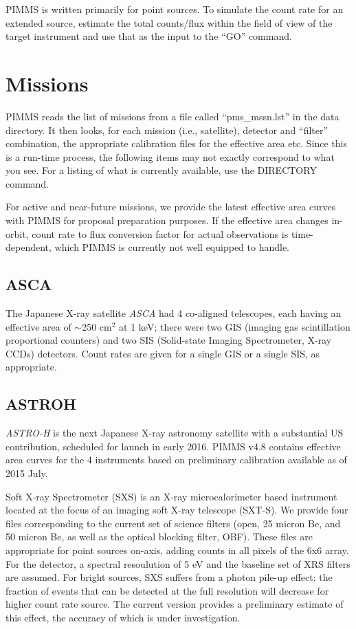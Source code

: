 PIMMS is written primarily for point sources.  To simulate the count
rate for an extended source, estimate the total counts/flux within the
field of view of the target instrument and use that as the input to
the ``GO'' command.

\section{Missions}

PIMMS reads the list of missions from a file called ``pms\_mssn.lst'' in the
data directory.     It then looks, for each mission (i.e., satellite),
detector and ``filter'' combination, the  appropriate calibration files for the
effective area etc.   Since this is a run-time process, the following items
may not exactly correspond to what you see.   For a listing of what is
currently available, use the DIRECTORY command.

For active and near-future missions, we provide the latest effective area
curves with PIMMS for proposal preparation purposes.  If the effective area
changes in-orbit, count rate to flux conversion factor for actual observations
is time-dependent, which PIMMS is currently not well equipped to handle.

\subsection{ASCA}

The Japanese X-ray satellite {\em ASCA\/} had 4 co-aligned telescopes,
each having an effective area  of $\sim$250 cm$^2$ at 1 keV; there were
two GIS (imaging gas scintillation proportional counters) and two SIS
(Solid-state Imaging Spectrometer, X-ray CCDs) detectors.  Count rates
are given for a single GIS or a single SIS, as appropriate.

\subsection{ASTROH}

{\em ASTRO-H\/} is the next Japanese X-ray astronomy satellite with a
substantial US contribution, scheduled for launch in early 2016.  PIMMS
v4.8 contains effective area curves for the 4 instruments based on
preliminary calibration available as of 2015 July.

Soft X-ray Spectrometer (SXS) is an X-ray microcalorimeter based instrument
located at the focus of an imaging soft X-ray telescope (SXT-S).  We provide
four files corresponding to the current set of science filters (open, 25
micron Be, and 50 micron Be, as well as the optical blocking filter, OBF).
These files are appropriate for point sources on-axis, adding counts in all
pixels of the 6x6 array.  For the detector, a spectral resoulution of 5 eV
and the baseline set of XRS filters are assumed.  For bright sources, SXS
suffers from a photon pile-up effect: the fraction of events that can be
detected at the full resolution will decrease for higher count rate source.
The current version provides a preliminary estimate of this effect, the
accuracy of which is under investigation.

